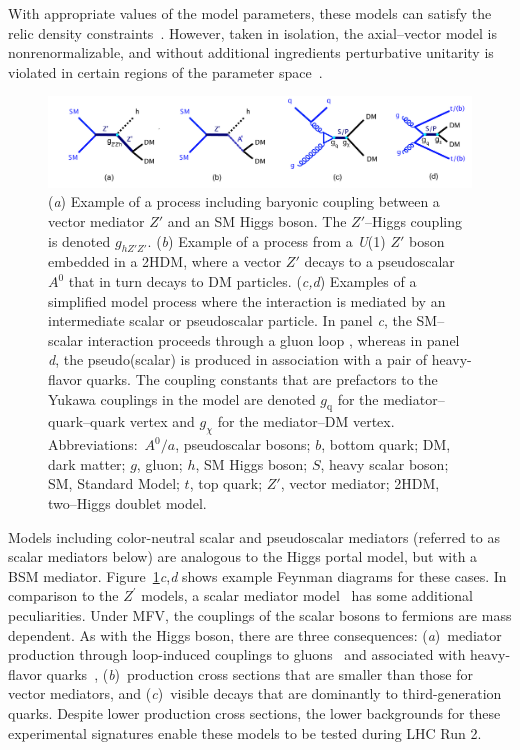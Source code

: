 \documentclass{ar-1col}
\newcommand{\chiDM}{\ensuremath{\chi}\xspace}
\newcommand{\gDM}{\ensuremath{g_{\chiDM}}\xspace}
\newcommand{\gdm}{\gDM}
\newcommand{\gq}{$g_{\mathrm{q}}$\xspace}
\newcommand{\ghZprimeZprime}{\ensuremath{g_{hZ'Z'}}\xspace}
\newcommand{\Zprime}{\ensuremath{{Z}^\prime}\xspace}
\providecommand{\DIFaddbeginFL}{} %
\providecommand{\DIFaddendFL}{} %
\begin{document}
{With appropriate values of the model parameters, 
these models can satisfy the relic density
constraints~\cite{Chala:2015ama}. However, taken in isolation,
the axial--vector model is nonrenormalizable, and without additional ingredients 
perturbative unitarity is violated in certain regions of the
parameter space~\cite{Chala:2015ama,Kahlhoefer:2015bea,Boveia:2016mrp}.

\begin{figure}[!htpb]
\DIFaddbeginFL \includegraphics[width=\textwidth]{figs_standalone/feynman_1}
\DIFaddendFL \caption{
(\textit{a}) Example of a process including baryonic coupling between a vector mediator $Z'$ and an SM Higgs boson. The $Z'$--Higgs coupling is denoted \ghZprimeZprime. 
(\textit{b}) Example of a process from a \textit{U}(1) $Z'$ boson embedded in a 2HDM, where a vector $Z'$ decays to a pseudoscalar $A^0$ that in turn decays to DM particles. 
(\textit{c,d}) Examples of a simplified model process where the interaction is mediated by an intermediate scalar or pseudoscalar particle. In panel \textit{c}, the SM--scalar interaction proceeds through a gluon loop \cite{Haisch:2013ata}, whereas in panel \textit{d}, the pseudo(scalar) is produced in association with a pair of heavy-flavor quarks. The coupling constants that are prefactors to the Yukawa couplings in the model are denoted \gq for the mediator--quark--quark vertex and \gdm for the mediator--DM vertex. 
Abbreviations:\ $A^0/a$, pseudoscalar bosons; $b$, bottom quark; DM, dark matter;  $g$, gluon; $h$, SM Higgs boson; $S$, heavy scalar boson; SM, Standard Model; $t$, top quark; $Z'$, vector mediator; 2HDM, two--Higgs doublet model. }
\label{fig:feynman_1}
\end{figure}

Models including {color-neutral scalar and pseudoscalar mediators (referred to as scalar mediators below)} are analogous
to the Higgs portal model, but with a BSM mediator. Figure~\ref{fig:feynman_1}\textit{c},\textit{d} shows example Feynman diagrams for these cases.  In comparison to the \Zprime
models, a scalar mediator
model~\cite{Buckley:2014fba} has some additional peculiarities.
Under MFV, the couplings of the scalar bosons to fermions
are mass dependent. As with the Higgs boson, there are three
consequences: (\textit{a})\ mediator production through loop-induced
couplings to gluons~\cite{Haisch:2015ioa} and associated with
heavy-flavor quarks~\cite{Buckley:2014fba}, (\textit{b})\ production
cross sections that are smaller than those for vector mediators, and (\textit{c})\ visible
decays that are dominantly to third-generation quarks.
Despite lower production cross sections, the lower backgrounds for these
experimental signatures enable these models to be tested during
LHC Run 2.

}
\end{document}
